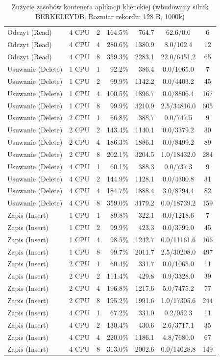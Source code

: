 \begin{table}[ht]
{\begin{tabular}{llcrrcc}
Odczyt (Read) & 4 CPU & 2 & 164.5\% & 764.7 & 62.6/0.0 & 6 \\
Odczyt (Read) & 4 CPU & 4 & 280.6\% & 1380.9 & 8.0/102.4 & 12 \\
Odczyt (Read) & 4 CPU & 8 & 359.3\% & 2283.1 & 22.0/6451.2 & 65 \\
Usuwanie (Delete) & 1 CPU & 1 & 92.2\% & 386.4 & 0.0/1065.0 & 7 \\
Usuwanie (Delete) & 1 CPU & 2 & 99.9\% & 1142.2 & 0.0/4403.2 & 45 \\
Usuwanie (Delete) & 1 CPU & 4 & 100.5\% & 1896.7 & 0.0/8806.4 & 167 \\
Usuwanie (Delete) & 1 CPU & 8 & 99.9\% & 3210.9 & 2.5/34816.0 & 605 \\
Usuwanie (Delete) & 2 CPU & 1 & 66.8\% & 388.7 & 0.0/747.5 & 9 \\
Usuwanie (Delete) & 2 CPU & 2 & 143.4\% & 1140.1 & 0.0/3379.2 & 30 \\
Usuwanie (Delete) & 2 CPU & 4 & 186.3\% & 1886.1 & 0.0/8499.2 & 89 \\
Usuwanie (Delete) & 2 CPU & 8 & 202.1\% & 3204.5 & 1.0/18432.0 & 284 \\
Usuwanie (Delete) & 4 CPU & 1 & 60.1\% & 388.3 & 0.0/737.3 & 9 \\
Usuwanie (Delete) & 4 CPU & 2 & 144.9\% & 1128.1 & 0.0/4300.8 & 31 \\
Usuwanie (Delete) & 4 CPU & 4 & 184.7\% & 1888.4 & 3.0/8294.4 & 82 \\
Usuwanie (Delete) & 4 CPU & 8 & 359.0\% & 3179.2 & 0.0/18739.2 & 159 \\
Zapis (Insert) & 1 CPU & 1 & 89.8\% & 322.1 & 0.0/1218.6 & 7 \\
Zapis (Insert) & 1 CPU & 2 & 99.9\% & 423.3 & 0.0/3799.0 & 45 \\
Zapis (Insert) & 1 CPU & 4 & 98.5\% & 1242.7 & 0.0/11161.6 & 166 \\
Zapis (Insert) & 1 CPU & 8 & 99.7\% & 2011.7 & 2.5/30208.0 & 497 \\
Zapis (Insert) & 2 CPU & 1 & 60.4\% & 331.7 & 0.0/1065.0 & 11 \\
Zapis (Insert) & 2 CPU & 2 & 111.4\% & 429.8 & 0.9/3328.0 & 39 \\
Zapis (Insert) & 2 CPU & 4 & 196.8\% & 1217.6 & 5.0/7475.2 & 77 \\
Zapis (Insert) & 2 CPU & 8 & 195.2\% & 1991.6 & 1.0/17305.6 & 244 \\
Zapis (Insert) & 4 CPU & 1 & 67.2\% & 331.0 & 0.2/952.3 & 11 \\
Zapis (Insert) & 4 CPU & 2 & 130.4\% & 430.6 & 2.6/3717.1 & 35 \\
Zapis (Insert) & 4 CPU & 4 & 220.0\% & 1186.1 & 4.8/7680.0 & 67 \\
Zapis (Insert) & 4 CPU & 8 & 313.0\% & 2002.6 & 0.0/14028.8 & 149 \\
\bottomrule
\end{tabular}%
}
\caption{Zużycie zasobów kontenera aplikacji klienckiej (wbudowany silnik BERKELEYDB, Rozmiar rekordu: 128 B, 1000k)}
\label{tab:resources_berkeleydb_small_1000000}
\end{table}
